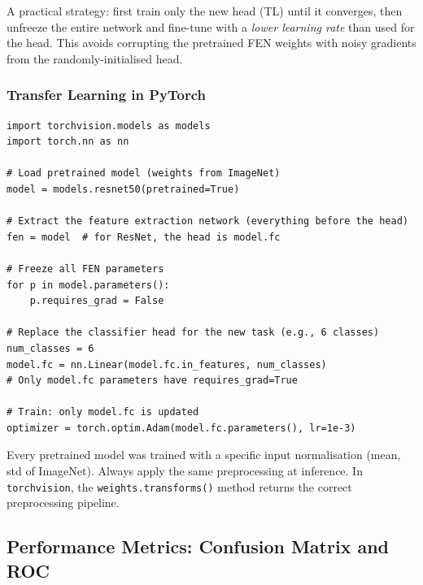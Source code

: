 \documentclass[11pt,a4paper]{article}
\begin{document}
\begin{insightbox}
A practical strategy: first train only the new head (TL) until it converges, then unfreeze the entire network and fine-tune with a \emph{lower learning rate} than used for the head. This avoids corrupting the pretrained FEN weights with noisy gradients from the randomly-initialised head.
\end{insightbox}

\subsubsection{Transfer Learning in PyTorch}

\begin{lstlisting}[caption={Transfer learning with a pretrained model in PyTorch}]
import torchvision.models as models
import torch.nn as nn

# Load pretrained model (weights from ImageNet)
model = models.resnet50(pretrained=True)

# Extract the feature extraction network (everything before the head)
fen = model  # for ResNet, the head is model.fc

# Freeze all FEN parameters
for p in model.parameters():
    p.requires_grad = False

# Replace the classifier head for the new task (e.g., 6 classes)
num_classes = 6
model.fc = nn.Linear(model.fc.in_features, num_classes)
# Only model.fc parameters have requires_grad=True

# Train: only model.fc is updated
optimizer = torch.optim.Adam(model.fc.parameters(), lr=1e-3)
\end{lstlisting}

\begin{warnbox}
Every pretrained model was trained with a specific input normalisation (mean, std of ImageNet). Always apply the same preprocessing at inference. In \texttt{torchvision}, the \texttt{weights.transforms()} method returns the correct preprocessing pipeline.
\end{warnbox}

\subsection{Performance Metrics: Confusion Matrix and ROC}
\end{document}
